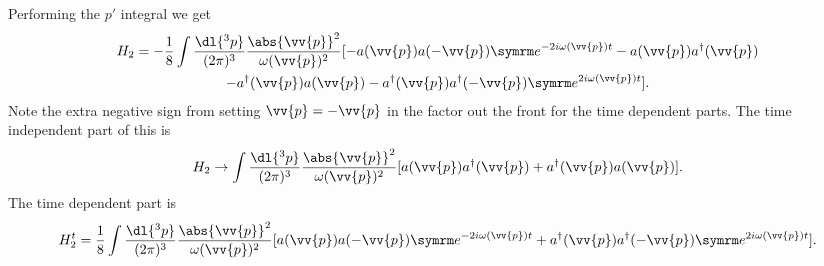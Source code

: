 Performing the \(p'\) integral we get
\begin{multline}
    H_2 = -\frac{1}{8} \int \frac{\dl{^3p}}{(2\pi)^3} \frac{\abs{\vv{p}}^2}{\omega(\vv{p})^2} [-a(\vv{p})a(-\vv{p})\e^{-2i\omega(\vv{p})t} - a(\vv{p})a^\hermit(\vv{p})\\
    - a^\hermit(\vv{p}) a(\vv{p}) - a^\hermit(\vv{p})a^\hermit(-\vv{p})\e^{2i\omega(\vv{p})t}].
\end{multline}
Note the extra negative sign from setting \(\vv{p} = -\vv{p}\) in the factor out the front for the time dependent parts.
The time independent part of this is
\begin{equation}
    H_2 \to \int \frac{\dl{^3p}}{(2\pi)^3} \frac{\abs{\vv{p}}^2}{\omega(\vv{p})^2} [a(\vv{p})a^\hermit(\vv{p}) + a^\hermit(\vv{p})a(\vv{p})].
\end{equation}
The time dependent part is
\begin{equation}
    H_2^t = \frac{1}{8} \int \frac{\dl{^3p}}{(2\pi)^3} \frac{\abs{\vv{p}}^2}{\omega(\vv{p})^2} [a(\vv{p})a(-\vv{p})\e^{-2i\omega(\vv{p})t} + a^\hermit(\vv{p})a^\hermit(-\vv{p})\e^{2i\omega(\vv{p})t}].
\end{equation}

